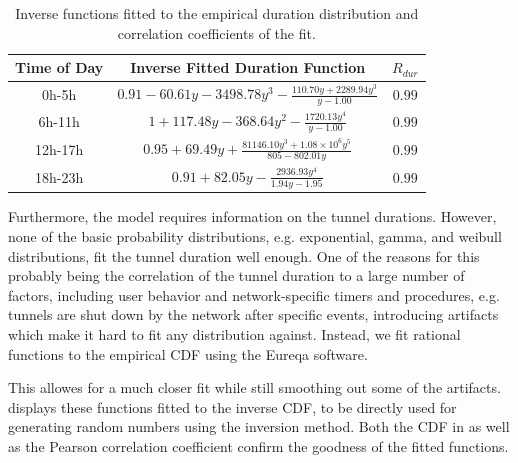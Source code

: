 \begin{table}
  \centering
  \caption{Inverse functions fitted to the empirical duration distribution and correlation coefficients of the fit.}
  \label{tab:cloud:virtualized_network_functions:measurement_data:evaluation:duration_fits}  
  \begin{tabular}{ccc}
  \toprule
  Time of Day & Inverse Fitted Duration Function & \(R_{dur}\)\\
  \midrule
  0h-5h & $0.91 - 60.61y - 3498.78y^3 - \frac{110.70y + 2289.94y^3}{y - 1.00}$ &  $0.99$ \\
  6h-11h & $1 + 117.48y - 368.64y^2 - \frac{1720.13y^4}{y - 1.00}$ & $0.99$ \\
  12h-17h & $0.95 + 69.49y + \frac{81146.10y^3 + 1.08\times10^6y^5}{805 - 802.01y}$ & $0.99$ \\
  18h-23h & $0.91 + 82.05y - \frac{2936.93y^4}{1.94y - 1.95}$ & $0.99$\\
  \bottomrule
  \end{tabular}
\end{table}

Furthermore, the model requires information on the tunnel durations.
However, none of the basic probability distributions, e.g. exponential, gamma, and weibull distributions, fit the tunnel duration well enough.
One of the reasons for this probably being the correlation of the tunnel duration to a large number of factors, including user behavior and network-specific timers and procedures, e.g. tunnels are shut down by the network after specific events, introducing artifacts which make it hard to fit any distribution against.
Instead, we fit rational functions to the empirical \gls{CDF} using the Eureqa \cite{Schmidt2009} software.

This allowes for a much closer fit while still smoothing out some of the artifacts.
 displays these functions fitted to the inverse \gls{CDF}, to be directly used for generating random numbers using the inversion method.
Both the \gls{CDF} in  as well as the Pearson correlation coefficient confirm the goodness of the fitted functions.

